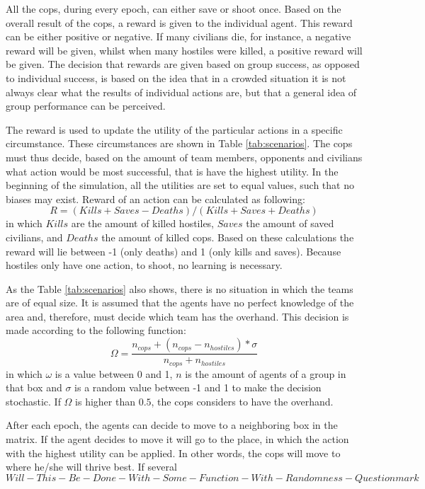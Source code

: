 All the cops, during every epoch, can either save or shoot once. Based on the overall result of the cops, a reward is given to the individual agent. This reward can be either positive or negative. If many civilians die, for instance, a negative reward will be given, whilst when many hostiles were killed, a positive reward will be given. The decision that rewards are given based on group success, as opposed to individual success, is based on the idea that in a crowded situation it is not always clear what the results of individual actions are, but that a general idea of group performance can be perceived. 

The reward is used to update the utility of the particular actions in a specific circumstance. These circumstances are shown in Table \ref{tab:scenarios}. The cops must thus decide, based on the amount of team members, opponents and civilians what action would be most successful, that is have the highest utility. In the beginning of the simulation, all the utilities are set to equal values, such that no biases may exist. Reward of an action can be calculated as following: 
$$ R = (Kills + Saves - Deaths)/(Kills + Saves + Deaths)$$
in which $Kills$ are the amount of killed hostiles, $Saves$ the amount of saved civilians, and $Deaths$ the amount of killed cops. Based on these calculations the reward will lie between -1 (only deaths) and 1 (only kills and saves). Because hostiles only have one action, to shoot, no learning is necessary. 

As the Table \ref{tab:scenarios} also shows, there is no situation in which the teams are of equal size. It is assumed that the agents have no perfect knowledge of the area and, therefore, must decide which team has the overhand. This decision is made according to the following function:
$$ \Omega = \frac{n_{cops} + (n_{cops}-n_{hostiles})*\sigma}{n_{cops} + n_{hostiles}} $$
in which $\omega$ is a value between 0 and 1, $n$ is the amount of agents of a group in that box and $\sigma$ is a random value between -1 and 1 to make the decision stochastic. If $\Omega$ is higher than $0.5$, the cops considers to have the overhand.

After each epoch, the agents can decide to move to a neighboring box in the matrix. If the agent decides to move it will go to the place, in which the action with the highest utility can be applied. In other words, the cops will move to where he/she will thrive best. If several 
$$ Will-This-Be-Done-With-Some-Function-With-Randomness-Questionmark$$

